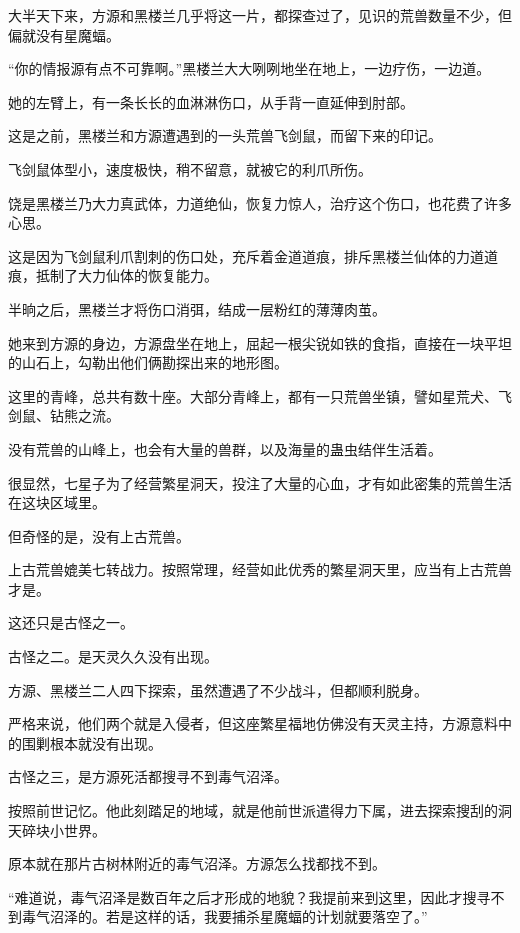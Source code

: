 
\begin{this_body}



大半天下来，方源和黑楼兰几乎将这一片，都探查过了，见识的荒兽数量不少，但偏就没有星魔蝠。

“你的情报源有点不可靠啊。”黑楼兰大大咧咧地坐在地上，一边疗伤，一边道。

她的左臂上，有一条长长的血淋淋伤口，从手背一直延伸到肘部。

这是之前，黑楼兰和方源遭遇到的一头荒兽飞剑鼠，而留下来的印记。

飞剑鼠体型小，速度极快，稍不留意，就被它的利爪所伤。

饶是黑楼兰乃大力真武体，力道绝仙，恢复力惊人，治疗这个伤口，也花费了许多心思。

这是因为飞剑鼠利爪割刺的伤口处，充斥着金道道痕，排斥黑楼兰仙体的力道道痕，抵制了大力仙体的恢复能力。

半晌之后，黑楼兰才将伤口消弭，结成一层粉红的薄薄肉茧。

她来到方源的身边，方源盘坐在地上，屈起一根尖锐如铁的食指，直接在一块平坦的山石上，勾勒出他们俩勘探出来的地形图。

这里的青峰，总共有数十座。大部分青峰上，都有一只荒兽坐镇，譬如星荒犬、飞剑鼠、钻熊之流。

没有荒兽的山峰上，也会有大量的兽群，以及海量的蛊虫结伴生活着。

很显然，七星子为了经营繁星洞天，投注了大量的心血，才有如此密集的荒兽生活在这块区域里。

但奇怪的是，没有上古荒兽。

上古荒兽媲美七转战力。按照常理，经营如此优秀的繁星洞天里，应当有上古荒兽才是。

这还只是古怪之一。

古怪之二。是天灵久久没有出现。

方源、黑楼兰二人四下探索，虽然遭遇了不少战斗，但都顺利脱身。

严格来说，他们两个就是入侵者，但这座繁星福地仿佛没有天灵主持，方源意料中的围剿根本就没有出现。

古怪之三，是方源死活都搜寻不到毒气沼泽。

按照前世记忆。他此刻踏足的地域，就是他前世派遣得力下属，进去探索搜刮的洞天碎块小世界。

原本就在那片古树林附近的毒气沼泽。方源怎么找都找不到。

“难道说，毒气沼泽是数百年之后才形成的地貌？我提前来到这里，因此才搜寻不到毒气沼泽的。若是这样的话，我要捕杀星魔蝠的计划就要落空了。”


\end{this_body}
